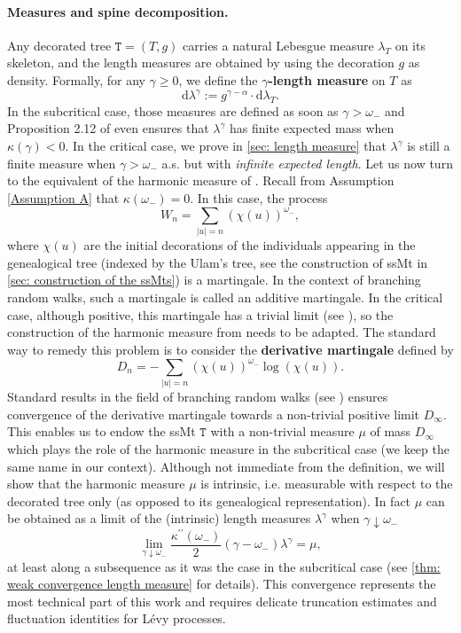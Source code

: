 \documentclass[12pt]{article}
\numberwithin{equation}{section}
\theoremstyle{plain}
\theoremstyle{definition}
\newcommand{\D}{\mathrm{d}}
\begin{document}
\paragraph{Measures and spine decomposition.}
Any decorated tree $\mathtt{T}=(T,g)$ carries a natural Lebesgue measure $\lambda_{T}$ on its skeleton, and the length measures are obtained by using the decoration $g$ as density. Formally, for any $\gamma \geq 0$, we define the \textbf{$\gamma$-length measure} on $T$ as
$$\D \lambda^{\gamma}:=g^{\gamma-\alpha} \cdot \D \lambda_{T}.$$ In the subcritical case, those measures are defined as soon as $\gamma > \omega_-$ and Proposition 2.12 of \cite{BertoinJean2024SMta} even ensures that $\lambda^\gamma$ has finite expected mass when $\kappa(\gamma) <0$. In the critical case, we prove in \cref{sec: length measure} that $ \lambda^{\gamma}$ is still a finite measure when $\gamma>\omega_-$ a.s. but with \textit{infinite expected length}. Let us now turn to the equivalent of the harmonic measure of \cite[Chapter 2.3.3]{BertoinJean2024SMta}. Recall from Assumption \ref{Assumption A} that $\kappa(\omega_-)=0$. In this case, the  process
\[W_n = \sum_{|u| = n} (\chi(u))^{\omega_-},\] where $\chi(u)$ are the initial decorations of the individuals appearing in the genealogical tree (indexed by the Ulam's tree, see the construction of ssMt in \cref{sec: construction of the ssMts}) is a martingale. In the context of branching random walks, such a martingale is called an additive martingale. In the critical case, although positive, this martingale has a trivial limit  (see \cite[Theorem 3.3]{ShiZhan2016BRWE}), so the construction of the harmonic measure from \cite{BertoinJean2024SMta} needs to be adapted. The standard way to remedy this problem is to consider the \textbf{derivative martingale} defined by
\begin{equation}
D_n = -\sum_{|u| = n} (\chi(u))^{\omega_-}\log(\chi(u)).
\end{equation}
Standard results in the field of branching random walks (see \cite[Section 5]{ShiZhan2016BRWE}) ensures convergence of the derivative martingale towards a non-trivial positive limit ${D}_\infty$. This enables us to endow the ssMt $\mathtt{T}$ with a non-trivial measure $\mu$ of mass ${D}_\infty$ which plays the role of the harmonic measure in the subcritical case (we keep the same name in our context). Although not immediate from the definition, we will show that the harmonic measure $\mu$ is intrinsic, i.e. measurable with respect to the decorated tree only (as opposed to its genealogical representation). In fact $\mu$ can be obtained as a limit of the (intrinsic) length measures $\lambda^\gamma$ when $\gamma \downarrow \omega_-$
\[\lim_{\gamma \downarrow\omega_-} \frac{\kappa^{\prime\prime}(\omega_-)}{2}(\gamma-\omega_-)\lambda^{\gamma} = \mu, \]
at least along a subsequence as it was the case in the subcritical case \cite[Proposition 2.15]{BertoinJean2024SMta} (see \cref{thm: weak convergence length measure} for details). This convergence represents the most technical part of this work and requires delicate truncation estimates and fluctuation identities for L\'evy processes.
\end{document}
